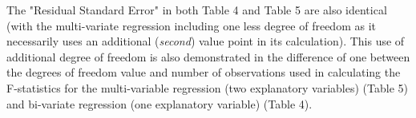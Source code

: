 \documentclass[12pt,letterpaper]{article}
\begin{document}
\begin{enumerate}
			The "Residual Standard Error" in both Table 4 and Table 5 are also identical (with the multi-variate regression including one less degree of freedom as it necessarily uses an additional (\textit{second}) value point in its calculation). This use of additional degree of freedom is also demonstrated in the difference of one between the degrees of freedom value and number of observations used in calculating the F-statistics for the multi-variable regression (two explanatory variables) (Table 5) and bi-variate regression (one explanatory variable) (Table 4).
			
			
		
	\end{enumerate}
	
	
\end{document}
